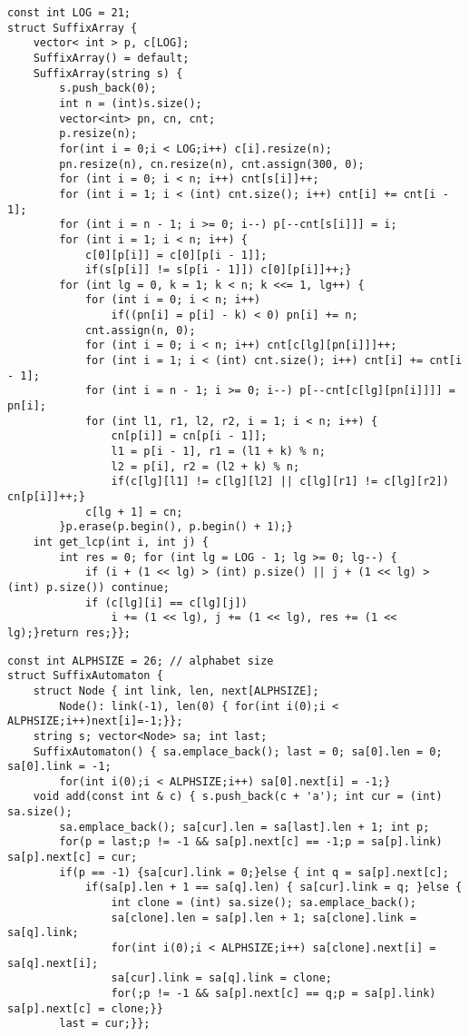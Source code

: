 \documentclass[a4paper,12pt]{article}
\begin{document}
\begin{verbatim}
const int LOG = 21;
struct SuffixArray {
    vector< int > p, c[LOG];
    SuffixArray() = default;
    SuffixArray(string s) {
        s.push_back(0);
        int n = (int)s.size();
        vector<int> pn, cn, cnt;
        p.resize(n);
        for(int i = 0;i < LOG;i++) c[i].resize(n);
        pn.resize(n), cn.resize(n), cnt.assign(300, 0);
        for (int i = 0; i < n; i++) cnt[s[i]]++;
        for (int i = 1; i < (int) cnt.size(); i++) cnt[i] += cnt[i - 1];
        for (int i = n - 1; i >= 0; i--) p[--cnt[s[i]]] = i;
        for (int i = 1; i < n; i++) {
            c[0][p[i]] = c[0][p[i - 1]];
            if(s[p[i]] != s[p[i - 1]]) c[0][p[i]]++;}
        for (int lg = 0, k = 1; k < n; k <<= 1, lg++) {
            for (int i = 0; i < n; i++)
                if((pn[i] = p[i] - k) < 0) pn[i] += n;
            cnt.assign(n, 0);
            for (int i = 0; i < n; i++) cnt[c[lg][pn[i]]]++;
            for (int i = 1; i < (int) cnt.size(); i++) cnt[i] += cnt[i - 1];
            for (int i = n - 1; i >= 0; i--) p[--cnt[c[lg][pn[i]]]] = pn[i];
            for (int l1, r1, l2, r2, i = 1; i < n; i++) {
                cn[p[i]] = cn[p[i - 1]];
                l1 = p[i - 1], r1 = (l1 + k) % n;
                l2 = p[i], r2 = (l2 + k) % n;
                if(c[lg][l1] != c[lg][l2] || c[lg][r1] != c[lg][r2]) cn[p[i]]++;}
            c[lg + 1] = cn;
        }p.erase(p.begin(), p.begin() + 1);}
    int get_lcp(int i, int j) {
        int res = 0; for (int lg = LOG - 1; lg >= 0; lg--) {
            if (i + (1 << lg) > (int) p.size() || j + (1 << lg) > (int) p.size()) continue;
            if (c[lg][i] == c[lg][j])
                i += (1 << lg), j += (1 << lg), res += (1 << lg);}return res;}};
\end{verbatim}

\begin{verbatim}
const int ALPHSIZE = 26; // alphabet size
struct SuffixAutomaton {
    struct Node { int link, len, next[ALPHSIZE];
        Node(): link(-1), len(0) { for(int i(0);i < ALPHSIZE;i++)next[i]=-1;}};
    string s; vector<Node> sa; int last;
    SuffixAutomaton() { sa.emplace_back(); last = 0; sa[0].len = 0; sa[0].link = -1;
        for(int i(0);i < ALPHSIZE;i++) sa[0].next[i] = -1;}
    void add(const int & c) { s.push_back(c + 'a'); int cur = (int) sa.size();
        sa.emplace_back(); sa[cur].len = sa[last].len + 1; int p;
        for(p = last;p != -1 && sa[p].next[c] == -1;p = sa[p].link) sa[p].next[c] = cur;
        if(p == -1) {sa[cur].link = 0;}else { int q = sa[p].next[c];
            if(sa[p].len + 1 == sa[q].len) { sa[cur].link = q; }else {
                int clone = (int) sa.size(); sa.emplace_back();
                sa[clone].len = sa[p].len + 1; sa[clone].link = sa[q].link;
                for(int i(0);i < ALPHSIZE;i++) sa[clone].next[i] = sa[q].next[i];
                sa[cur].link = sa[q].link = clone;
                for(;p != -1 && sa[p].next[c] == q;p = sa[p].link) sa[p].next[c] = clone;}}
        last = cur;}};
\end{verbatim}
\end{document}
